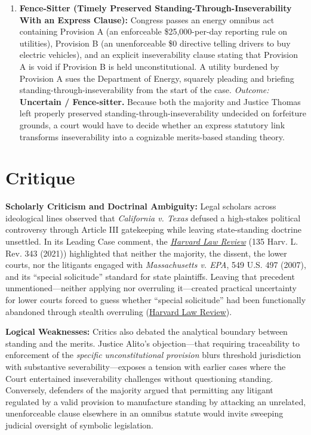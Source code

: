 \documentclass[12pt]{article}
\begin{document}
\begin{enumerate}
  \item \textbf{Fence-Sitter (Timely Preserved Standing-Through-Inseverability With an Express Clause):} Congress passes an energy omnibus act containing Provision A (an enforceable \$25,000-per-day reporting rule on utilities), Provision B (an unenforceable \$0 directive telling drivers to buy electric vehicles), and an explicit inseverability clause stating that Provision A is void if Provision B is held unconstitutional. A utility burdened by Provision A sues the Department of Energy, squarely pleading and briefing standing-through-inseverability from the start of the case. \textit{Outcome:} \textbf{Uncertain / Fence-sitter.} Because both the majority and Justice Thomas left properly preserved standing-through-inseverability undecided on forfeiture grounds, a court would have to decide whether an express statutory link transforms inseverability into a cognizable merits-based standing theory.
\end{enumerate}

\section{Critique}

\textbf{Scholarly Criticism and Doctrinal Ambiguity:} Legal scholars across ideological lines observed that \textit{California v. Texas} defused a high-stakes political controversy through Article III gatekeeping while leaving state-standing doctrine unsettled. In its Leading Case comment, the \href{https://harvardlawreview.org/print/vol-135/california-v-texas/}{\textit{Harvard Law Review}} (135 Harv. L. Rev. 343 (2021)) highlighted that neither the majority, the dissent, the lower courts, nor the litigants engaged with \textit{Massachusetts v. EPA}, 549 U.S. 497 (2007), and its ``special solicitude'' standard for state plaintiffs. Leaving that precedent unmentioned---neither applying nor overruling it---created practical uncertainty for lower courts forced to guess whether ``special solicitude'' had been functionally abandoned through stealth overruling (\href{https://harvardlawreview.org/print/vol-135/california-v-texas/}{Harvard Law Review}).

\textbf{Logical Weaknesses:} Critics also debated the analytical boundary between standing and the merits. Justice Alito's objection---that requiring traceability to enforcement of the \textit{specific unconstitutional provision} blurs threshold jurisdiction with substantive severability---exposes a tension with earlier cases where the Court entertained inseverability challenges without questioning standing. Conversely, defenders of the majority argued that permitting any litigant regulated by a valid provision to manufacture standing by attacking an unrelated, unenforceable clause elsewhere in an omnibus statute would invite sweeping judicial oversight of symbolic legislation.
\end{document}
